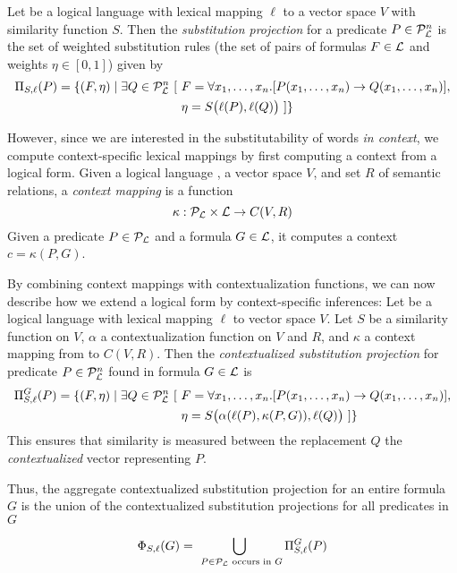Let \loglang be a logical language with lexical mapping $\ell$ to a vector space
$V$ with similarity function $S$. Then the \textit{substitution projection} 
for a predicate $P \in {\cal{P}}_{{\cal{L}}}^n$ is the set of weighted substitution
rules (the set of pairs of formulas $F \in {\cal{L}}$ and weights $\eta \in
[0,1]$) given by
\begin{align*}
\Pi_{S, \ell}(P) = \{ (F, \eta) \mid \exists Q \in {\cal{P}}_{{\cal{L}}}^n~[ 
&~F = \forall x_1, \ldots, x_n.[P(x_1, \ldots, x_n) \to Q(x_1, \ldots, x_n)], \\
&~\eta = S\big(\ell(P), \ell(Q)\big) ~] \}
\end{align*}

However, since we are interested in the substitutability of words {\it in
context}, we compute context-specific lexical mappings by first computing a
context from a logical form. Given a logical language \loglang, a vector space
$V$, and set $R$ of semantic relations, a \textit{context mapping} is a function
\[ \kappa: {\cal{P}}_{{\cal{L}}} \times {\cal{L}} \to C(V, R) \] Given a predicate
$P \in {\cal{P}}_{{\cal{L}}}$ and a formula $G \in {\cal{L}}$, it computes a context
$c = \kappa(P, G)$.

By combining context mappings with contextualization functions, we can now
describe how we extend a logical form by context-specific inferences: Let
\loglang be a logical language with lexical mapping $\ell$ to vector space $V$.
Let $S$ be a similarity function on $V$, $\alpha$ a contextualization function
on $V$ and $R$, and $\kappa$ a context mapping from \loglang to $C(V, R)$.
Then the \textit{contextualized substitution projection} for predicate $P \in
{\cal{P}}_{{\cal{L}}}^n$ found in formula $G \in {\cal{L}}$ is
\begin{align*}
\Pi^G_{S, \ell}(P) = \{ (F, \eta) \mid \exists Q \in {\cal{P}}_{{\cal{L}}}^n~[ 
&~F = \forall x_1, \ldots, x_n.[P(x_1, \ldots, x_n) \to Q(x_1, \ldots, x_n)], \\
&~\eta = S\big(\alpha(\ell(P), \kappa(P, G)), \ell(Q)\big) ~] \}
\end{align*}
This ensures that similarity is measured between the replacement $Q$ the {\em contextualized}
vector representing $P$.

Thus, the aggregate contextualized substitution projection for an entire formula
$G$ is the union of the contextualized substitution projections for all
predicates in $G$

\[\Phi_{S, \ell}(G) = \bigcup_{~P \in {\cal{P}}_{{\cal{L}}} \text{ occurs in }
G} \Pi^G_{S, \ell}(P) \] 

